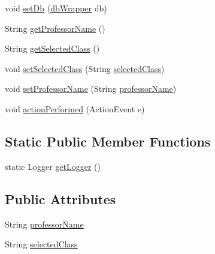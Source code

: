 \begin{DoxyCompactItemize}
\item 
void \mbox{\hyperlink{classcom_1_1_b_n_u_1_1pages_1_1classes_by_teacher_1_1_class_by_teacher_controller_a073a5a3b362b6920d7a8304a52c9c454}{set\+Db}} (\mbox{\hyperlink{interfacecom_1_1_b_n_u_1_1database_1_1db_wrapper}{db\+Wrapper}} db)
\item 
String \mbox{\hyperlink{classcom_1_1_b_n_u_1_1pages_1_1classes_by_teacher_1_1_class_by_teacher_controller_ad9a17e7d9b812714e0cfecda9e509b3d}{get\+Professor\+Name}} ()
\item 
String \mbox{\hyperlink{classcom_1_1_b_n_u_1_1pages_1_1classes_by_teacher_1_1_class_by_teacher_controller_af9cd774556383cba70ce8e6f73d86afb}{get\+Selected\+Class}} ()
\item 
void \mbox{\hyperlink{classcom_1_1_b_n_u_1_1pages_1_1classes_by_teacher_1_1_class_by_teacher_controller_acbbb3998d51f6e421fbfa4e3eaf2f00e}{set\+Selected\+Class}} (String \mbox{\hyperlink{classcom_1_1_b_n_u_1_1pages_1_1classes_by_teacher_1_1_class_by_teacher_controller_af803e533017795ef220f835c7f21ee34}{selected\+Class}})
\item 
void \mbox{\hyperlink{classcom_1_1_b_n_u_1_1pages_1_1classes_by_teacher_1_1_class_by_teacher_controller_ae214c16daa158825a64ed00beac2728d}{set\+Professor\+Name}} (String \mbox{\hyperlink{classcom_1_1_b_n_u_1_1pages_1_1classes_by_teacher_1_1_class_by_teacher_controller_a3766efec56cc53a6910c04a8b445666b}{professor\+Name}})
\item 
void \mbox{\hyperlink{classcom_1_1_b_n_u_1_1pages_1_1classes_by_teacher_1_1_class_by_teacher_controller_a803227b40c40bef872625f48fb4f9792}{action\+Performed}} (Action\+Event e)
\end{DoxyCompactItemize}
\subsection*{Static Public Member Functions}
\begin{DoxyCompactItemize}
\item 
static Logger \mbox{\hyperlink{classcom_1_1_b_n_u_1_1pages_1_1classes_by_teacher_1_1_class_by_teacher_controller_ac97bfe5ef9f38c8559d6db6f8407dd06}{get\+Logger}} ()
\end{DoxyCompactItemize}
\subsection*{Public Attributes}
\begin{DoxyCompactItemize}
\item 
String \mbox{\hyperlink{classcom_1_1_b_n_u_1_1pages_1_1classes_by_teacher_1_1_class_by_teacher_controller_a3766efec56cc53a6910c04a8b445666b}{professor\+Name}}
\item 
String \mbox{\hyperlink{classcom_1_1_b_n_u_1_1pages_1_1classes_by_teacher_1_1_class_by_teacher_controller_af803e533017795ef220f835c7f21ee34}{selected\+Class}}
\end{DoxyCompactItemize}
